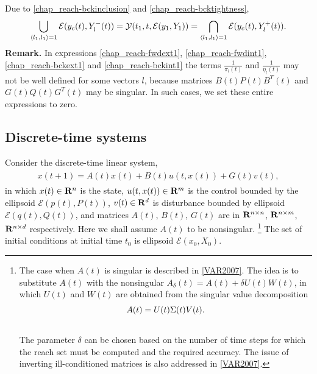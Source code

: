 \documentclass[letterpaper,10pt,english]{sphinxmanual}
\begin{document}
Due to \eqref{chap_reach-bckinclusion} and \eqref{chap_reach-bcktightness},
\begin{gather}
\begin{split}\bigcup_{\langle l_1,l_1\rangle=1}{\mathcal E}(y_c(t),Y^-_l(t)) =
{\mathcal Y}(t_1,t,{\mathcal E}(y_1,Y_1)) =
\bigcap_{\langle l_1,l_1\rangle=1}{\mathcal E}(y_c(t),Y^+_l(t)).\end{split}\notag
\end{gather}
\textbf{Remark.} In expressions \eqref{chap_reach-fwdext1}, \eqref{chap_reach-fwdint1}, \eqref{chap_reach-bckext1} and
\eqref{chap_reach-bckint1} the terms $\frac{1}{\pi_l(t)}$ and
$\frac{1}{\eta_l(t)}$ may not be well defined for some vectors
$l$, because matrices $B(t)P(t)B^T(t)$ and
$G(t)Q(t)G^T(t)$ may be singular. In such cases, we set these
entire expressions to zero.


\subsection{Discrete-time systems}
\label{chap_reach:discrete-time-systems}
Consider the discrete-time linear system,
\label{chap_reach:equation-dtsystem}\begin{gather}
\begin{split}x(t+1) = A(t)x(t) + B(t)u(t,x(t)) + G(t)v(t),\end{split}\label{chap_reach-dtsystem}
\end{gather}
in which $x(t)\in{\bf R}^n$ is the state,
$u(t, x(t))\in{\bf R}^m$ is the control bounded by the ellipsoid
${\mathcal E}(p(t),P(t))$, $v(t)\in{\bf R}^d$ is disturbance
bounded by ellipsoid ${\mathcal E}(q(t),Q(t))$, and matrices
$A(t)$, $B(t)$, $G(t)$ are in
${\bf R}^{n\times n}$, ${\bf R}^{n\times m}$,
${\bf R}^{n\times d}$ respectively. Here we shall assume
$A(t)$ to be nonsingular. \footnote{
The case when $A(t)$ is singular is described in {\hyperref[chap_reach:var2007]{{[}VAR2007{]}}}.
The idea is to substitute $A(t)$ with the
nonsingular $A_\delta(t) = A(t) + \delta U(t)W(t)$, in which
$U(t)$ and $W(t)$ are obtained from the singular value
decomposition
\begin{gather}
\begin{split}A(t) = U(t)\Sigma(t)V(t) .\end{split}\notag\\\begin{split}\end{split}\notag
\end{gather}
The parameter $\delta$ can be chosen based on the number of
time steps for which the reach set must be computed and the required
accuracy. The issue of inverting ill-conditioned matrices is also
addressed in {\hyperref[chap_reach:var2007]{{[}VAR2007{]}}}.
} The set of initial conditions at
initial time $t_0$ is ellipsoid ${\mathcal E}(x_0,X_0)$.
\end{document}
